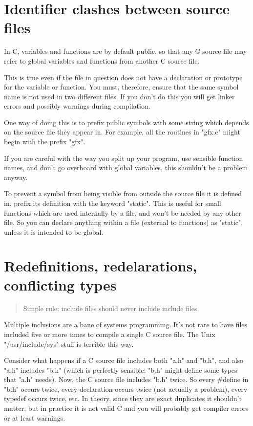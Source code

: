 \documentclass{report}
\begin{document}
\section{Identifier clashes between source files} 
In C, variables and functions are by default public, so that any C source file may refer to global variables and functions from another C source file.

This is true even if the file in question does not have a declaration or prototype for the variable or function. You must, therefore, ensure that the same symbol name is not used in two different files. If you don't do this you will get linker errors and possibly warnings during compilation.
 
One way of doing this is to prefix public symbols with some string which depends on the source file they appear in. For example, all the routines in "gfx.c" might begin with the prefix "gfx".

If you are careful with the way you split up your program, use sensible function names, and don't go overboard with global variables, this shouldn't be a problem anyway.

To prevent a symbol from being visible from outside the source file it is defined in, prefix its definition with the keyword "static". This is useful for small functions which are used internally by a file, and won't be needed by any other file.
So you can declare anything within a file (external to functions) as "static", unless it is intended to be global. 

\section{Redefinitions, redelarations, conflicting types}
\begin{quote}
Simple rule: include files should never include include files.
\end{quote}
Multiple inclusions are a bane of systems programming. It's not rare to have files included five or more times to compile a single C source file. The Unix "/usr/include/sys" stuff is terrible this way.

Consider what happens if a C source file includes both "a.h" and "b.h", and also "a.h" includes "b.h" (which is perfectly sensible: "b.h" might define some types that "a.h" needs). Now, the C source file includes "b.h" twice. So every \#define in "b.h" occurs twice, every declaration occurs twice (not actually a problem), every typedef occurs twice, etc. In theory, since they are exact duplicates it shouldn't matter, but in practice it is not valid C and you will probably get compiler errors or at least warnings.
\end{document}
